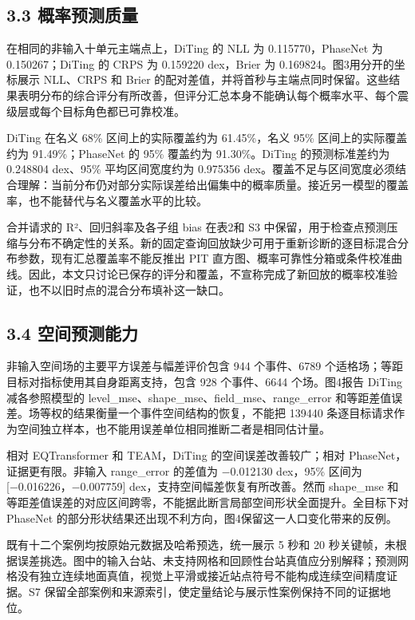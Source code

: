 \documentclass[UTF8,a4paper,11pt]{ctexart}
\begin{document}
\subsection*{3.3 概率预测质量}

在相同的非输入十单元主端点上，DiTing 的 NLL 为 0.115770，PhaseNet 为 0.150267；DiTing 的 CRPS 为 0.159220 dex，Brier 为 0.169824。图3用分开的坐标展示 NLL、CRPS 和 Brier 的配对差值，并将首秒与主端点同时保留。这些结果表明分布的综合评分有所改善，但评分汇总本身不能确认每个概率水平、每个震级层或每个目标角色都已可靠校准。

DiTing 在名义 68\% 区间上的实际覆盖约为 61.45\%，名义 95\% 区间上的实际覆盖约为 91.49\%；PhaseNet 的 95\% 覆盖约为 91.30\%。DiTing 的预测标准差约为 0.248804 dex、95\% 平均区间宽度约为 0.975356 dex。覆盖不足与区间宽度必须结合理解：当前分布仍对部分实际误差给出偏集中的概率质量。接近另一模型的覆盖率，也不能替代与名义覆盖水平的比较。

合并请求的 R²、回归斜率及各子组 bias 在表2和 S3 中保留，用于检查点预测压缩与分布不确定性的关系。新的固定查询回放缺少可用于重新诊断的逐目标混合分布参数，现有汇总覆盖率不能反推出 PIT 直方图、概率可靠性分箱或条件校准曲线。因此，本文只讨论已保存的评分和覆盖，不宣称完成了新回放的概率校准验证，也不以旧时点的混合分布填补这一缺口。

\subsection*{3.4 空间预测能力}

非输入空间场的主要平方误差与幅差评价包含 944 个事件、6789 个适格场；等距目标对指标使用其自身距离支持，包含 928 个事件、6644 个场。图4报告 DiTing 减各参照模型的 level\_mse、shape\_mse、field\_mse、range\_error 和等距差值误差。场等权的结果衡量一个事件空间结构的恢复，不能把 139440 条逐目标请求作为空间独立样本，也不能用误差单位相同推断二者是相同估计量。

相对 EQTransformer 和 TEAM，DiTing 的空间误差改善较广；相对 PhaseNet，证据更有限。非输入 range\_error 的差值为 −0.012130 dex，95\% 区间为 [−0.016226，−0.007759] dex，支持空间幅差恢复有所改善。然而 shape\_mse 和等距差值误差的对应区间跨零，不能据此断言局部空间形状全面提升。全目标下对 PhaseNet 的部分形状结果还出现不利方向，图4保留这一人口变化带来的反例。

既有十二个案例均按原始元数据及哈希预选，统一展示 5 秒和 20 秒关键帧，未根据误差挑选。图中的输入台站、未支持网格和回顾性台站真值应分别解释；预测网格没有独立连续地面真值，视觉上平滑或接近站点符号不能构成连续空间精度证据。S7 保留全部案例和来源索引，使定量结论与展示性案例保持不同的证据地位。
\end{document}

